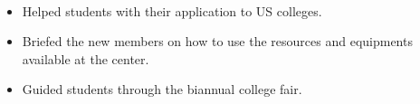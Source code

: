 \\
\begin{itemize}
    \item Helped students with their application to US colleges.
    \item Briefed the new members on how to use the resources and equipments available at the center.
    \item Guided students through the biannual college fair.
\end{itemize}
